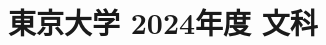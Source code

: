 ﻿\documentclass[../../uem_tok_q.tex]{subfiles}
\begin{document}
    \section{東京大学 2024年度 文科}
    \subsection{　}
    
    \vfill
    \subsection{　}
    
    \vfill
    \newpage
    \subsection{　}
    
    \vfill
    \subsection{　}
    
    \vfill
\end{document}
